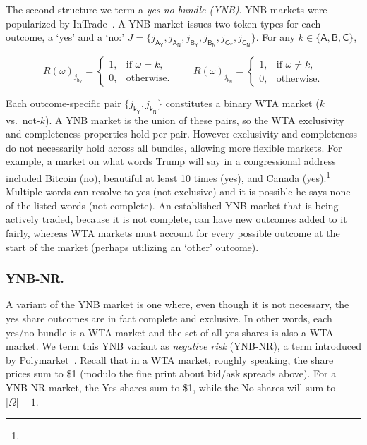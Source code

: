 The second structure we term a \textit{yes-no bundle (YNB)}. YNB markets were popularized by InTrade~\cite{intrade}. A YNB market issues two token types for each outcome, a `yes' and a `no:'  $J=\{j_{\mathsf{A_Y}}, j_{\mathsf{A_N}}, j_{\mathsf{B_Y}}, j_{\mathsf{B_N}}, j_{\mathsf{C_Y}},j_{\mathsf{C_N}} \}$. For any $k\in\{\mathsf{A},\mathsf{B},\mathsf{C}\}$,

\begin{equation}
R(\omega)_{j_{\mathsf{k_Y}}}=
\begin{cases}
1, & \text{if } \omega=k,\\
0, & \text{otherwise.}
\end{cases}
\qquad
R(\omega)_{j_{\mathsf{k_N}}}=
\begin{cases}
1, & \text{if } \omega\neq k,\\
0, & \text{otherwise.}
\end{cases}
\end{equation}

Each outcome-specific pair $\{j_{\mathsf{k_Y}}, j_{\mathsf{k_N}}\}$ constitutes a binary WTA market ($k$ vs.\ not-$k$). A YNB market is the union of these pairs, so the WTA exclusivity and completeness properties hold per pair. However exclusivity and completeness do not necessarily hold across all bundles, allowing more flexible markets. For example, a market on what words Trump will say in a congressional address included Bitcoin (no), beautiful at least 10 times (yes), and Canada (yes).\footnote{} Multiple words can resolve to yes (not exclusive) and it is possible he says none of the listed words (not complete). An established YNB market that is being actively traded, because it is not complete, can have new outcomes added to it fairly, whereas WTA markets must account for every possible outcome at the start of the market (perhaps utilizing an `other' outcome).

\subsubsection{YNB-NR.}

A variant of the YNB market is one where, even though it is not necessary, the yes share outcomes are in fact complete and exclusive. In other words, each yes/no bundle is a WTA market and the set of all yes shares is also a WTA market. We term this YNB variant as \textit{negative risk} (YNB-NR), a term introduced by Polymarket~\cite{poly}. Recall that in a WTA market, roughly speaking, the share prices sum to \$1 (modulo the fine print about bid/ask spreads above). For a YNB-NR market, the Yes shares sum to \$1, while the No shares will sum to $|\Omega|-1$.

